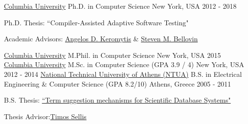 

\begin{cventries}

  \cventry
    {\href{http://www.cs.columbia.edu/}{Columbia University}}
    {Ph.D. in Computer Science}
    {New York, USA}
    {2012 - 2018}
    {
      \begin{cvitems}
     \item{Ph.D. Thesis: ``Compiler-Assisted Adaptive Software Testing"}
      \item{Academic Advisors: \href{https://www.cs.columbia.edu/~angelos} {Angelos D. Keromytis} \& \href{https://www.cs.columbia.edu/~smb/} {Steven M. Bellovin}}
      \end{cvitems}
    }
  \cventry
    {\href{http://www.cs.columbia.edu/}{Columbia University}}
    {M.Phil. in Computer Science}
    {New York, USA}
    {2015}
    {}
  \cventry
    {\href{http://www.cs.columbia.edu/}{Columbia University}}
    {M.Sc. in Computer Science (GPA 3.9 / 4)}
    {New York, USA}
    {2012 - 2014}
    {}
  \cventry
    {\href{http://www.ece.ntua.gr/}{National Technical University of Athens (NTUA)}}
    {B.S. in Electrical Engineering \& Computer Science (GPA 8.2/10)}
    {Athens, Greece}
    {2005 - 2011}
    {
      \begin{cvitems}
      \item{B.S. Thesis: \href{http://www.dbnet.ece.ntua.gr/pubs/uploads/DIPL-2011-7.pdf}{``Term suggestion mechanisms for Scientific Database Systems"}}
       \item{Thesis Advisor:\href{https://scholar.google.gr/citations?user=G1Iux80AAAAJ} {Timos Sellis}}
      \end{cvitems}
    }

\end{cventries}
